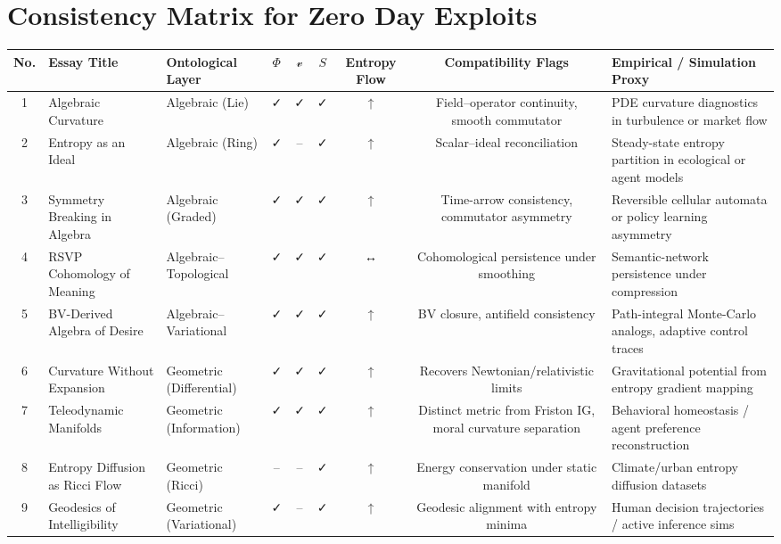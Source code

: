 \appendix
\section*{Consistency Matrix for Zero Day Exploits}

\begin{table}[H]
\centering
\renewcommand{\arraystretch}{1.25}
\setlength{\tabcolsep}{4pt}
\scriptsize
\begin{tabular}{@{}cllcccccl@{}}
\toprule
\textbf{No.} & \textbf{Essay Title} & \textbf{Ontological Layer} & \(\Phi\) & \(\boldsymbol{\mathcal{v}}\) & \(S\) & \textbf{Entropy Flow} & \textbf{Compatibility Flags} & \textbf{Empirical / Simulation Proxy} \\
\midrule
1 & Algebraic Curvature & Algebraic (Lie) & ✓ & ✓ & ✓ & ↑ & Field–operator continuity, smooth commutator & PDE curvature diagnostics in turbulence or market flow \\
2 & Entropy as an Ideal & Algebraic (Ring) & ✓ & – & ✓ & ↑ & Scalar–ideal reconciliation & Steady-state entropy partition in ecological or agent models \\
3 & Symmetry Breaking in Algebra & Algebraic (Graded) & ✓ & ✓ & ✓ & ↑ & Time-arrow consistency, commutator asymmetry & Reversible cellular automata or policy learning asymmetry \\
4 & RSVP Cohomology of Meaning & Algebraic–Topological & ✓ & ✓ & ✓ & ↔ & Cohomological persistence under smoothing & Semantic-network persistence under compression \\
5 & BV-Derived Algebra of Desire & Algebraic–Variational & ✓ & ✓ & ✓ & ↑ & BV closure, antifield consistency & Path-integral Monte-Carlo analogs, adaptive control traces \\
6 & Curvature Without Expansion & Geometric (Differential) & ✓ & ✓ & ✓ & ↑ & Recovers Newtonian/relativistic limits & Gravitational potential from entropy gradient mapping \\
7 & Teleodynamic Manifolds & Geometric (Information) & ✓ & ✓ & ✓ & ↑ & Distinct metric from Friston IG, moral curvature separation & Behavioral homeostasis / agent preference reconstruction \\
8 & Entropy Diffusion as Ricci Flow & Geometric (Ricci) & – & – & ✓ & ↑ & Energy conservation under static manifold & Climate/urban entropy diffusion datasets \\
9 & Geodesics of Intelligibility & Geometric (Variational) & ✓ & – & ✓ & ↑ & Geodesic alignment with entropy minima & Human decision trajectories / active inference sims \\

\end{tabular}
\end{table}
